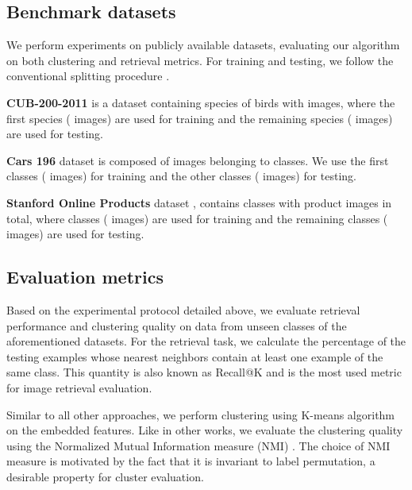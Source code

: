 \documentclass[runningheads]{llncs}
\begin{document}
\subsection{Benchmark datasets}
We perform experiments on  publicly available datasets, evaluating our algorithm on both clustering and retrieval metrics. For training and testing, we follow the conventional splitting procedure \cite{DBLP:conf/cvpr/SongXJS16}.

\textbf{CUB-200-2011} \cite{WahCUB_200_2011} is a dataset containing  species of birds with  images, where the first  species ( images) are used for training and the remaining  species ( images) are used for testing.

\textbf{Cars 196} \cite{KrauseStarkDengFei-Fei_3DRR2013} dataset is composed of  images belonging to  classes. We use the first  classes ( images) for training and the other  classes ( images) for testing.

\textbf{Stanford Online Products} dataset \cite{DBLP:conf/cvpr/SongXJS16}, contains  classes with  product images in total, where  classes ( images) are used for training and the remaining  classes ( images) are used for testing.

\subsection{Evaluation metrics}
Based on the experimental protocol detailed above, we evaluate retrieval performance and clustering quality on data
from unseen classes of the  aforementioned datasets. For the retrieval task, we calculate the percentage of the testing examples whose  nearest neighbors contain at least one example of the same class. This quantity is also known as Recall@K \cite{DBLP:journals/pami/JegouDS11} and is the most used metric for image retrieval evaluation. 

Similar to all other approaches, we perform clustering using K-means algorithm \cite{MacQueen} on the embedded features. Like in other works, we evaluate the clustering quality using the Normalized Mutual Information measure (NMI) \cite{DBLP:journals/corr/abs-1110-2515}. The choice of NMI measure is motivated by the fact that it is invariant to label permutation, a desirable property for cluster evaluation. 
\end{document}
